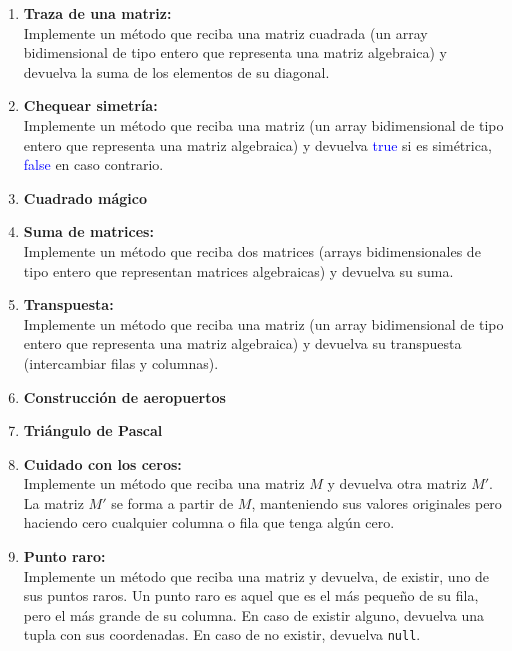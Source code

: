 \begin{enumerate}
    \item \textbf{Traza de una matriz:}\\
    Implemente un método que reciba una matriz cuadrada (un array bidimensional de tipo entero que representa una matriz algebraica) y devuelva la suma de los elementos de su diagonal.

    \item \textbf{Chequear simetría:}\\
    Implemente un método que reciba una matriz (un array bidimensional de tipo entero que representa una matriz algebraica) y devuelva \textcolor{blue}{true} si es simétrica, \textcolor{blue}{false} en caso contrario.

    \item \textbf{Cuadrado mágico}\\
    

    \item \textbf{Suma de matrices:}\\
    Implemente un método que reciba dos matrices (arrays bidimensionales de tipo entero que representan matrices algebraicas) y devuelva su suma.

    \item \textbf{Transpuesta:}\\
    Implemente un método que reciba una matriz (un array bidimensional de tipo entero que representa una matriz algebraica) y devuelva su transpuesta (intercambiar filas y columnas).

    \item \textbf{Construcción de aeropuertos}\\
    

    \item \textbf{Triángulo de Pascal}\\
    

    \item \textbf{Cuidado con los ceros:}\\
    Implemente un método que reciba una matriz \(M\) y devuelva otra matriz \(M'\). La matriz \(M'\) se forma a partir de \(M\), manteniendo sus valores originales pero haciendo cero cualquier columna o fila que tenga algún cero.

    \item \textbf{Punto raro:}\\ 
    Implemente un método que reciba una matriz y devuelva, de existir, uno de sus puntos raros. Un punto raro es aquel que es el más pequeño de su fila, pero el más grande de su columna. En caso de existir alguno, devuelva una tupla con sus coordenadas. En caso de no existir, devuelva \texttt{null}.	


\end{enumerate}
